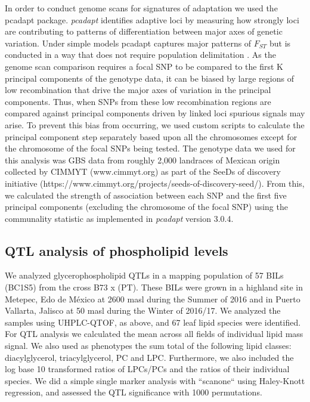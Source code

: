 \documentclass[9pt,twocolumn,twoside,lineno]{BioRxiv}
\begin{document}
In order to conduct genome scans for signatures of adaptation we used the pcadapt \cite{Luu2017-ws} package.
\textit{pcadapt} identifies adaptive loci by measuring how strongly loci are contributing to patterns of differentiation between major axes of genetic variation.
Under simple models  pcadapt captures major patterns of $F_{ST}$  but is conducted in a way that does not require population delimitation \cite{duforet2014genome}.
As the genome scan comparison requires a focal SNP to be compared to the first K principal components of the genotype data, it can be biased by large regions of low recombination that drive the major axes of variation in the principal components.
Thus, when SNPs from these low recombination regions are compared against principal components driven by linked loci spurious signals may arise.
To prevent this bias from occurring, we used custom scripts to calculate the principal component step separately based upon all the chromosomes except for the chromosome of the focal SNPs being tested.
The genotype data we used for this analysis was GBS data from roughly 2,000 landraces of Mexican origin collected by CIMMYT (www.cimmyt.org) as part of the SeeDs of discovery initiative (https://www.cimmyt.org/projects/seeds-of-discovery-seed/).
From this, we calculated the strength of association between each SNP and the first five principal components (excluding the chromosome of the focal SNP) using the communality statistic as implemented in \textit{pcadapt} version 3.0.4.

\subsection{QTL analysis of phospholipid levels}
We analyzed glycerophospholipid QTLs in a mapping population of 57 BILs (BC1S5) from the cross B73 x (PT).
These BILs were grown in a highland site in Metepec, Edo de M\'exico at 2600 masl during the Summer of 2016 and in Puerto Vallarta, Jalisco at 50 masl during the Winter of 2016/17.  
We analyzed the samples using UHPLC-QTOF, as above, and 67 leaf lipid species were identified.
For QTL analysis we calculated the mean across all fields of individual lipid mass signal. 
We also used as phenotypes the sum total of the following lipid classes: diacylglycerol, triacylglycerol, PC and  LPC.  
Furthermore,  we also included the log base 10 transformed ratios of LPCs/PCs and the ratios of their individual species. 
We did a simple single marker analysis  with ``scanone`` using Haley-Knott  regression, and assessed the QTL significance with 1000 permutations.
\end{document}
